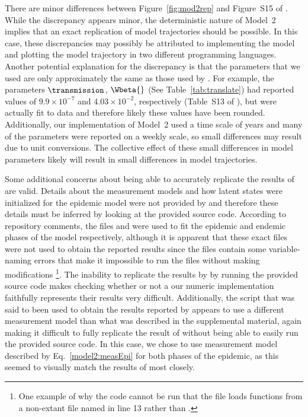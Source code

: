 There are minor differences between Figure~\ref{fig:mod2rep} and Figure~S15 of \cite{lee20sup}.
While the discrepancy appears minor, the deterministic nature of Model~2 implies that an exact replication of model trajectories should be possible.
In this case, these discrepancies may possibly be attributed to implementing the model and plotting the model trajectory in two different programming languages.
Another potential explanation for the discrepancy is that the parameters that we used are only approximately the same as those used by \citet{lee20sup}.
For example, the parameters $\transmission$, $\Wbeta{}$ (See Table~\ref{tab:translate}) had reported values of $9.9 \times 10^{-7}$ and $4.03 \times 10^{-2}$, respectively (Table~S13 of \cite{lee20sup}), but were actually fit to data and therefore likely these values have been rounded.
Additionally, our implementation of Model~2 used a time scale of years and many of the parameters were reported on a weekly scale, so small differences may result due to unit conversions.
The collective effect of these small differences in model parameters likely will result in small differences in model trajectories.

Some additional concerns about being able to accurately replicate the results of \cite{lee20} are valid.
Details about the measurement models and how latent states were initialized for the epidemic model were not provided by \citet{lee20sup} and therefore these details must be inferred by looking at the provided source code.
According to repository comments, the files  and  were used to fit the epidemic and endemic phases of the model respectively, although it is apparent that these exact files were not used to obtain the reported results since the files contain some variable-naming errors that make it impossible to run the files without making modifications \footnote{One example of why the code cannot be run that the file loads functions from a non-extant file named  in line 13 rather than .}.
The inability to replicate the results by \citet{lee20} by running the provided source code makes checking whether or not a our numeric implementation faithfully represents their results very difficult.
Additionally, the script that was said to been used to obtain the results reported by \cite{lee20} appears to use a different measurement model than what was described in the supplemental material, again making it difficult to fully replicate the result of \cite{lee20} without being able to easily run the provided source code.
In this case, we chose to use measurement model described by Eq.~\ref{model2:measEpi} for both phases of the epidemic, as this seemed to visually match the results of \cite{lee20} most closely.

